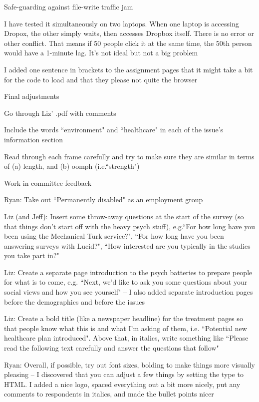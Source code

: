 \documentclass[12pt]{article}
\begin{document}
\begin{coi}
\begin{coi}
\begin{coi}
					\end{coi}					
				\item Safe-guarding against file-write traffic jam
					\begin{coi}
						\item I have tested it simultaneously on two laptops. When one laptop is accessing Dropox, the other simply waits, then accesses Dropbox itself. There is no error or other conflict. That means if 50 people click it at the same time, the 50th person would have a 1-minute lag. It's not ideal but not a big problem
						\item I added one sentence in brackets to the assignment pages that it might take a bit for the code to load and that they please not quite the browser
					\end{coi}
				\item Final adjustments
					\begin{coi}
						\item Go through Liz' .pdf with comments
						\item Include the words ``environment" and ``healthcare" in each of the issue's information section
						\item Read through each frame carefully and try to make sure they are similar in terms of (a) length, and (b) oomph (i.e.``strength")
					\end{coi}
				\item Work in committee feedback
					\begin{coi}
						\item Ryan: Take out ``Permanently disabled" as an employment group
						\item Liz (and Jeff): Insert some throw-away questions at the start of the survey (so that things don't start off with the heavy psych stuff), e.g.``For how long have you been using the Mechanical Turk service?", ``For how long have you been answering surveys with Lucid?", ``How interested are you typically in the studies you take part in?"
						\item Liz: Create a separate page introduction to the psych batteries to prepare people for what is to come, e.g. ``Next, we'd like to ask you some questions about your social views and how you see yourself"  -- I also added separate introduction pages before the demographics and before the issues
						\item Liz: Create a bold title (like a newspaper headline) for the treatment pages so that people know what this is and what I'm asking of them, i.e. ``Potential new healthcare plan introduced". Above that, in italics, write something like ``Please read the following text carefully and answer the questions that follow"
						\item Ryan: Overall, if possible, try out font sizes, bolding to make things more visually pleasing -- I discovered that you can adjust a few things by setting the type to HTML. I added a nice logo, spaced everything out a bit more nicely, put any comments to respondents in italics, and made the bullet points nicer
					\end{coi}
			\end{coi}
	\end{coi}
	
\end{document}
